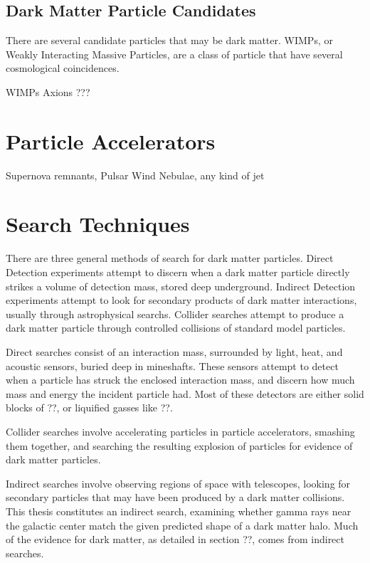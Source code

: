 \subsection{Dark Matter Particle Candidates}

There are several candidate particles that may be dark matter.
WIMPs, or Weakly Interacting Massive Particles, are a class of particle that have several cosmological coincidences.


WIMPs
Axions
???

\section{Particle Accelerators}

Supernova remnants, Pulsar Wind Nebulae, any kind of jet


\section{Search Techniques}


There are three general methods of search for dark matter particles.
Direct Detection experiments attempt to discern when a dark matter particle directly strikes a volume of detection mass, stored deep underground.
Indirect Detection experiments attempt to look for secondary products of dark matter interactions, usually through astrophysical searchs.
Collider searches attempt to produce a dark matter particle through controlled collisions of standard model particles.

Direct searches consist of an interaction mass, surrounded by light, heat, and acoustic sensors, buried deep in mineshafts.
These sensors attempt to detect when a particle has struck the enclosed interaction mass, and discern how much mass and energy the incident particle had.
Most of these detectors are either solid blocks of ??, or liquified gasses like ??.

Collider searches involve accelerating particles in particle accelerators, smashing them together, and searching the resulting explosion of particles for evidence of dark matter particles.

Indirect searches involve observing regions of space with telescopes, looking for secondary particles that may have been produced by a dark matter collisions.
This thesis constitutes an indirect search, examining whether gamma rays near the galactic center match the given predicted shape of a dark matter halo.
Much of the evidence for dark matter, as detailed in section ??, comes from indirect searches.



